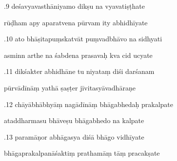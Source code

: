 \documentclass[article,12pt,a4paper]{memoir}%
\newcounter{parCount}
\begin{document}
	  
	  \pstart {}.9 deśavyavasthāniyamo dikṣu na vyavatiṣṭhate 
	{}
	\pend%
      

	  
	  \pstart \leavevmode%
	rūḍham apy aparatvena pūrvam ity abhidhīyate 
	{}
	\pend%
      

	  
	  \pstart {}.10 ato bhāṣitapuṃskatvāt puṃvadbhāvo na sidhyati 
	{}
	\pend%
      

	  
	  \pstart \leavevmode%
	asminn arthe na śabdena prasavaḥ kva cid ucyate 
	{}
	\pend%
      

	  
	  \pstart {}.11 dikśakter abhidhāne tu niyataṃ diśi darśanam 
	{}
	\pend%
      

	  
	  \pstart \leavevmode%
	pūrvādīnāṃ yathā ṣaṣṭer jīvitasyāvadhāraṇe 
	{}
	\pend%
      

	  
	  \pstart {}.12 chāyābhābhyāṃ nagādīnāṃ bhāgabhedaḥ prakalpate 
	{}
	\pend%
      

	  
	  \pstart \leavevmode%
	ataddharmasu bhāveṣu bhāgabhedo na kalpate 
	{}
	\pend%
      

	  
	  \pstart {}.13 paramāṇor abhāgasya diśā bhāgo vidhīyate 
	{}
	\pend%
      

	  
	  \pstart \leavevmode%
	bhāgaprakalpanāśaktiṃ prathamāṃ tāṃ pracakṣate 
	{}
	\pend%
      
\end{document}
